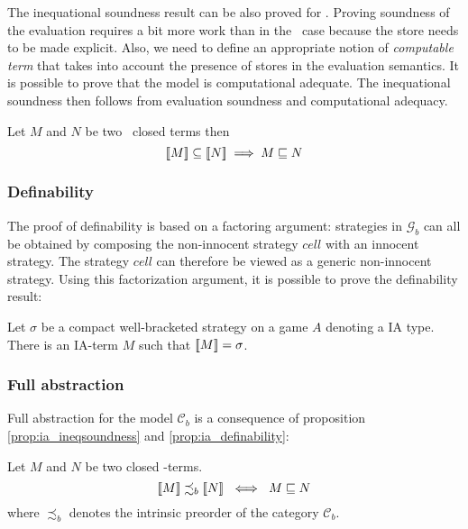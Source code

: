 The inequational soundness result can be also proved for \ialgol.
Proving soundness of the evaluation requires a bit more work than in
the \pcf\ case because the store needs to be made explicit. Also, we
need to define an appropriate notion of \emph{computable term} that
takes into account the presence of stores in the evaluation
semantics. It is possible to prove that the model is computational
adequate. The inequational soundness then follows from evaluation
soundness and computational adequacy.


\begin{prop}
\label{prop:ia_ineqsoundness} Let $M$ and $N$ be two \ialgol\ closed terms then
$${[\![ M ]\!]} \subseteq {[\![N ]\!]} \implies  M \sqsubseteq N $$
\end{prop}

\subsubsection{Definability}

The proof of definability is based on a factoring argument: strategies in
$\mathcal{G}_b$ can all be obtained by composing the non-innocent strategy $cell$ with an innocent strategy.
The strategy $cell$ can therefore be viewed as a generic non-innocent strategy. Using this factorization argument,
it is possible to prove the definability result:
\begin{prop}[Definability]
\label{prop:ia_definability} Let $\sigma$ be a compact well-bracketed
strategy on a game $A$ denoting a IA type. There is an IA-term $M$ such
that ${[\![ M ]\!]} = \sigma$.
\end{prop}

\subsubsection{Full abstraction}

Full abstraction for the model $\mathcal{C}_b$ is a consequence of proposition
\ref{prop:ia_ineqsoundness} and \ref{prop:ia_definability}:
\begin{thm}
Let $M$ and $N$ be two closed \ialgol-terms.
$${[\![ M ]\!]} \precsim_b {[\![ N ]\!]} \ \iff \ M \sqsubseteq N$$
where $\precsim_b$ denotes the intrinsic preorder of the category
$\mathcal{C}_b$.
\end{thm}


